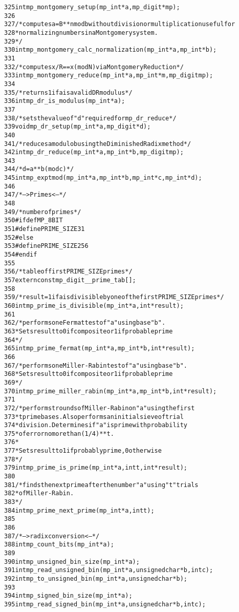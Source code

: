 \documentclass[b5paper]{book}
\begin{document}
\begin{small}
\begin{alltt}
325   int mp_montgomery_setup(mp_int *a, mp_digit *mp);
326   
327   /* computes a = B**n mod b without division or multiplication useful for
328    * normalizing numbers in a Montgomery system.
329    */
330   int mp_montgomery_calc_normalization(mp_int *a, mp_int *b);
331   
332   /* computes x/R == x (mod N) via Montgomery Reduction */
333   int mp_montgomery_reduce(mp_int *a, mp_int *m, mp_digit mp);
334   
335   /* returns 1 if a is a valid DR modulus */
336   int mp_dr_is_modulus(mp_int *a);
337   
338   /* sets the value of "d" required for mp_dr_reduce */
339   void mp_dr_setup(mp_int *a, mp_digit *d);
340   
341   /* reduces a modulo b using the Diminished Radix method */
342   int mp_dr_reduce(mp_int *a, mp_int *b, mp_digit mp);
343   
344   /* d = a**b (mod c) */
345   int mp_exptmod(mp_int *a, mp_int *b, mp_int *c, mp_int *d);
346   
347   /* ---> Primes <--- */
348   
349   /* number of primes */
350   #ifdef MP_8BIT
351      #define PRIME_SIZE      31
352   #else
353      #define PRIME_SIZE      256
354   #endif
355   
356   /* table of first PRIME_SIZE primes */
357   extern const mp_digit __prime_tab[];
358   
359   /* result=1 if a is divisible by one of the first PRIME_SIZE primes */
360   int mp_prime_is_divisible(mp_int *a, int *result);
361   
362   /* performs one Fermat test of "a" using base "b".
363    * Sets result to 0 if composite or 1 if probable prime
364    */
365   int mp_prime_fermat(mp_int *a, mp_int *b, int *result);
366   
367   /* performs one Miller-Rabin test of "a" using base "b".
368    * Sets result to 0 if composite or 1 if probable prime
369    */
370   int mp_prime_miller_rabin(mp_int *a, mp_int *b, int *result);
371   
372   /* performs t rounds of Miller-Rabin on "a" using the first
373    * t prime bases.  Also performs an initial sieve of trial
374    * division.  Determines if "a" is prime with probability
375    * of error no more than (1/4)**t.
376    *
377    * Sets result to 1 if probably prime, 0 otherwise
378    */
379   int mp_prime_is_prime(mp_int *a, int t, int *result);
380   
381   /* finds the next prime after the number "a" using "t" trials
382    * of Miller-Rabin.
383    */
384   int mp_prime_next_prime(mp_int *a, int t);
385   
386   
387   /* ---> radix conversion <--- */
388   int mp_count_bits(mp_int *a);
389   
390   int mp_unsigned_bin_size(mp_int *a);
391   int mp_read_unsigned_bin(mp_int *a, unsigned char *b, int c);
392   int mp_to_unsigned_bin(mp_int *a, unsigned char *b);
393   
394   int mp_signed_bin_size(mp_int *a);
395   int mp_read_signed_bin(mp_int *a, unsigned char *b, int c);

\end{alltt}
\end{small}
\end{document}
